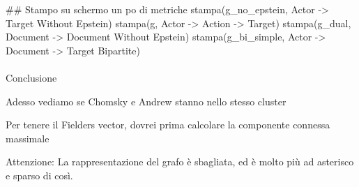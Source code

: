 \documentclass[
  italian,
  a4paper,
]{article}
\makeatletter
\let\oldparagraph\paragraph
\renewcommand{\paragraph}{
    \@ifstar
      \xxxParagraphStar
      \xxxParagraphNoStar
  }
\newcommand{\xxxParagraphStar}[1]{\oldparagraph*{#1}\mbox{}}
\newcommand{\xxxParagraphNoStar}[1]{\oldparagraph{#1}\mbox{}}
\newenvironment{Shaded}{\begin{snugshade}}{\end{snugshade}}
\newcommand{\CommentTok}[1]{\textcolor[rgb]{0.37,0.37,0.37}{#1}}
\newcommand{\NormalTok}[1]{\textcolor[rgb]{0.00,0.23,0.31}{#1}}
\newcommand{\StringTok}[1]{\textcolor[rgb]{0.13,0.47,0.30}{#1}}
\makeatother
\begin{document}
\begin{Shaded}
\begin{Highlighting}[]
\CommentTok{\#\# Stampo su schermo un po\textquotesingle{} di metriche}
\NormalTok{stampa(g\_no\_epstein, }\StringTok{\textquotesingle{}Actor {-}\textgreater{} Target Without Epstein\textquotesingle{}}\NormalTok{)}
\NormalTok{stampa(g, }\StringTok{\textquotesingle{}Actor {-}\textgreater{} Action {-}\textgreater{} Target\textquotesingle{}}\NormalTok{)}
\NormalTok{stampa(g\_dual, }\StringTok{\textquotesingle{}Document {-}\textgreater{} Document Without Epstein\textquotesingle{}}\NormalTok{)}
\NormalTok{stampa(g\_bi\_simple, }\StringTok{\textquotesingle{}Actor {-}\textgreater{} Document {-}\textgreater{} Target Bipartite\textquotesingle{}}\NormalTok{)}
\end{Highlighting}
\end{Shaded}

\paragraph{Conclusione}\label{conclusione}

Adesso vediamo se Chomsky e Andrew stanno nello stesso cluster

Per tenere il Fielders vector, dovrei prima calcolare la componente
connessa massimale

Attenzione: La rappresentazione del grafo è sbagliata, ed è molto più ad
asterisco e sparso di così.
\end{document}
